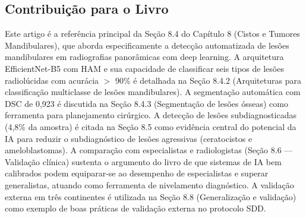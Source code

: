 \subsection{Contribuição para o Livro}
Este artigo é a referência principal da Seção 8.4 do Capítulo 8
(Cistos e Tumores Mandibulares), que aborda especificamente a
detecção automatizada de lesões mandibulares em radiografias
panorâmicas com deep learning. A arquitetura EfficientNet-B5 com
HAM e sua capacidade de classificar seis tipos de lesões
radiolúcidas com acurácia $>$ 90\% é detalhada na Seção 8.4.2
(Arquiteturas para classificação multiclasse de lesões mandibulares).
A segmentação automática com DSC de 0,923 é discutida na Seção 8.4.3
(Segmentação de lesões ósseas) como ferramenta para planejamento
cirúrgico. A detecção de lesões subdiagnosticadas (4,8\% da amostra)
é citada na Seção 8.5 como evidência central do potencial da IA
para reduzir o subdiagnóstico de lesões agressivas (ceratocistos e
ameloblastomas). A comparação com especialistas e radiologistas
(Seção 8.6 --- Validação clínica) sustenta o argumento do livro de
que sistemas de IA bem calibrados podem equiparar-se ao desempenho
de especialistas e superar generalistas, atuando como ferramenta
de nivelamento diagnóstico. A validação externa em três continentes
é utilizada na Seção 8.8 (Generalização e validação) como exemplo
de boas práticas de validação externa no protocolo SDD.


